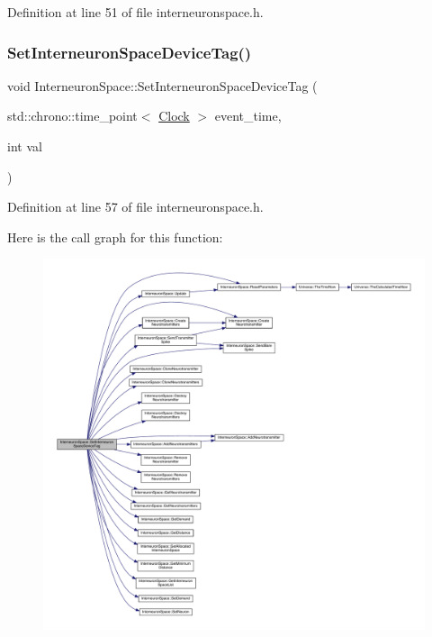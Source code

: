 Definition at line 51 of file interneuronspace.\+h.

\mbox{\label{class_interneuron_space_ab34d72ef9135288690328217d7c0a388}} 
\subsubsection{\texorpdfstring{Set\+Interneuron\+Space\+Device\+Tag()}{SetInterneuronSpaceDeviceTag()}}
{\footnotesize\ttfamily void Interneuron\+Space\+::\+Set\+Interneuron\+Space\+Device\+Tag (\begin{DoxyParamCaption}\item[{std\+::chrono\+::time\+\_\+point$<$ \hyperlink{universe_8h_a0ef8d951d1ca5ab3cfaf7ab4c7a6fd80}{Clock} $>$}]{event\+\_\+time,  }\item[{int}]{val }\end{DoxyParamCaption})\hspace{0.3cm}{\ttfamily [inline]}}



Definition at line 57 of file interneuronspace.\+h.

Here is the call graph for this function\+:
\nopagebreak
\begin{figure}[H]
\begin{center}
\leavevmode
\includegraphics[width=350pt]{class_interneuron_space_ab34d72ef9135288690328217d7c0a388_cgraph}
\end{center}
\end{figure}
\mbox{\label{class_interneuron_space_a50aaa97f71011dafb583dc432817f477}} 

